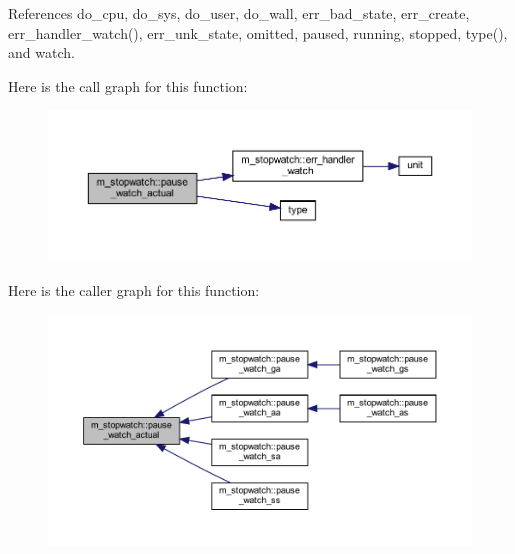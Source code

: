 References do\+\_\+cpu, do\+\_\+sys, do\+\_\+user, do\+\_\+wall, err\+\_\+bad\+\_\+state, err\+\_\+create, err\+\_\+handler\+\_\+watch(), err\+\_\+unk\+\_\+state, omitted, paused, running, stopped, type(), and watch.

Here is the call graph for this function\+:
\nopagebreak
\begin{figure}[H]
\begin{center}
\leavevmode
\includegraphics[width=350pt]{namespacem__stopwatch_a7c4ebc164b1871203ab72693f73038c0_cgraph}
\end{center}
\end{figure}
Here is the caller graph for this function\+:
\nopagebreak
\begin{figure}[H]
\begin{center}
\leavevmode
\includegraphics[width=350pt]{namespacem__stopwatch_a7c4ebc164b1871203ab72693f73038c0_icgraph}
\end{center}
\end{figure}
\mbox{\label{namespacem__stopwatch_a7e89d5f8738809ee67019645810aa9d5}} 
